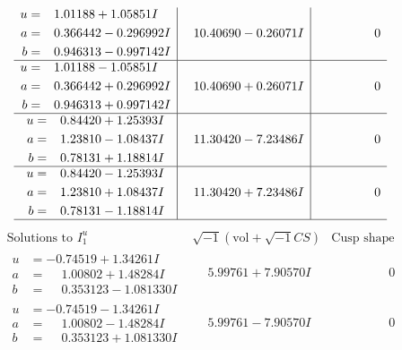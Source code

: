 \documentclass[1p]{elsarticle_modified}
\theoremstyle{definition}
\newcommand{\I}{\sqrt{-1}}
\begin{document}
$$\begin{array}{c|c|c}
\begin{aligned}
u &= \phantom{-}1.01188 + 1.05851 I \\
a &= \phantom{-}0.366442 - 0.296992 I \\
b &= \phantom{-}0.946313 - 0.997142 I\end{aligned}
 & \phantom{-}10.40690 - 0.26071 I & \phantom{-0.000000 } 0 \\ \hline\begin{aligned}
u &= \phantom{-}1.01188 - 1.05851 I \\
a &= \phantom{-}0.366442 + 0.296992 I \\
b &= \phantom{-}0.946313 + 0.997142 I\end{aligned}
 & \phantom{-}10.40690 + 0.26071 I & \phantom{-0.000000 } 0 \\ \hline\begin{aligned}
u &= \phantom{-}0.84420 + 1.25393 I \\
a &= \phantom{-}1.23810 - 1.08437 I \\
b &= \phantom{-}0.78131 + 1.18814 I\end{aligned}
 & \phantom{-}11.30420 - 7.23486 I & \phantom{-0.000000 } 0 \\ \hline\begin{aligned}
u &= \phantom{-}0.84420 - 1.25393 I \\
a &= \phantom{-}1.23810 + 1.08437 I \\
b &= \phantom{-}0.78131 - 1.18814 I\end{aligned}
 & \phantom{-}11.30420 + 7.23486 I & \phantom{-0.000000 } 0\\
 \hline 
 \end{array}$$\newpage$$\begin{array}{c|c|c}  
\text{Solutions to }I^u_{1}& \I (\text{vol} + \sqrt{-1}CS) & \text{Cusp shape}\\
 \hline 
\begin{aligned}
u &= -0.74519 + 1.34261 I \\
a &= \phantom{-}1.00802 + 1.48284 I \\
b &= \phantom{-}0.353123 - 1.081330 I\end{aligned}
 & \phantom{-}5.99761 + 7.90570 I & \phantom{-0.000000 } 0 \\ \hline\begin{aligned}
u &= -0.74519 - 1.34261 I \\
a &= \phantom{-}1.00802 - 1.48284 I \\
b &= \phantom{-}0.353123 + 1.081330 I\end{aligned}
 & \phantom{-}5.99761 - 7.90570 I & \phantom{-0.000000 } 0 \\ \hline\begin{aligned}

\end{aligned}
\end{array}$$
\end{document}
